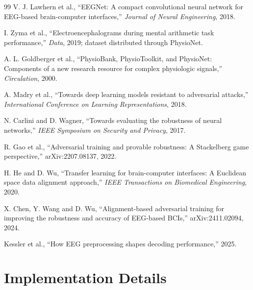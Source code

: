 \documentclass[10pt,a4paper,openright]{report}
\begin{document}
\cleardoublepage
{}
\begin{thebibliography}{99}
V. J. Lawhern et al., ``EEGNet: A compact convolutional neural network for EEG-based brain-computer interfaces,'' \emph{Journal of Neural Engineering}, 2018.

I. Zyma et al., ``Electroencephalograms during mental arithmetic task performance,'' \emph{Data}, 2019; dataset distributed through PhysioNet.

A. L. Goldberger et al., ``PhysioBank, PhysioToolkit, and PhysioNet: Components of a new research resource for complex physiologic signals,'' \emph{Circulation}, 2000.

A. Madry et al., ``Towards deep learning models resistant to adversarial attacks,'' \emph{International Conference on Learning Representations}, 2018.

N. Carlini and D. Wagner, ``Towards evaluating the robustness of neural networks,'' \emph{IEEE Symposium on Security and Privacy}, 2017.

R. Gao et al., ``Adversarial training and provable robustness: A Stackelberg game perspective,'' arXiv:2207.08137, 2022.

H. He and D. Wu, ``Transfer learning for brain-computer interfaces: A Euclidean space data alignment approach,'' \emph{IEEE Transactions on Biomedical Engineering}, 2020.

X. Chen, Y. Wang and D. Wu, ``Alignment-based adversarial training for improving the robustness and accuracy of EEG-based BCIs,'' arXiv:2411.02094, 2024.

Kessler et al., ``How EEG preprocessing shapes decoding performance,'' 2025.
\end{thebibliography}

\appendix
\chapter{Implementation Details}
\end{document}
